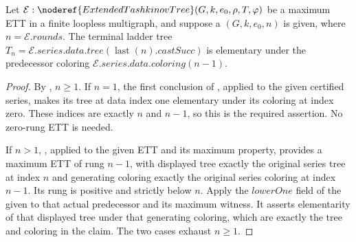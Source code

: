 \begin{lemma}
Let \(\mathcal E:\noderef{ExtendedTashkinovTree}(G,k,e_0,\rho,T,\varphi)\)
be a maximum ETT in a finite loopless multigraph, and suppose a
\((G,k,e_0,n)\) is given, where
\(n=\mathcal E.\mathit{rounds}\). The terminal ladder tree
\(T_n=\mathcal E.\mathit{series.data.tree}(\operatorname{last}(n).\mathit{castSucc})\)
is elementary under the predecessor coloring
\(\mathcal E.\mathit{series.data.coloring}(n-1)\).
\end{lemma}
\begin{proof}
By , \(n\geq1\). If \(n=1\), the first
conclusion of , applied to the given certified
series, makes its tree at data index one elementary under its coloring at
index zero. These indices are exactly \(n\) and \(n-1\), so this is the
required assertion. No zero-rung ETT is needed.

If \(n>1\), , applied to the given ETT and
its maximum property, provides a maximum ETT of rung \(n-1\), with displayed
tree exactly the original series tree at index \(n\) and generating coloring
exactly the original series coloring at index \(n-1\). Its rung is positive
and strictly below \(n\). Apply the \(\mathit{lowerOne}\) field of the given
 to that actual predecessor and its
maximum witness. It asserts elementarity of that displayed tree under that
generating coloring, which are exactly the tree and coloring in the claim.
The two cases exhaust \(n\geq1\).
\end{proof}
